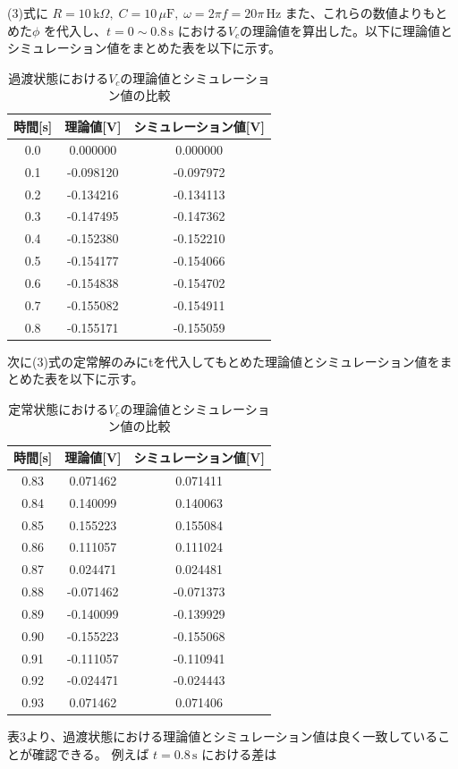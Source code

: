 \documentclass{jarticle}
\begin{document}
(3)式に
$R = 10\,\text{k}\Omega,\; C = 10\,\mu\text{F},\; \omega = 2\pi f = 20\pi\,\text{Hz}$
また、これらの数値よりもとめた$\phi$ を代入し、$t = 0 \sim 0.8\,\text{s}$
における$V_{c}$の理論値を算出した。以下に理論値とシミュレーション値をまとめた表を以下に示す。
\begin{table}[H]
\centering
\caption{過渡状態における$V_{c}$の理論値とシミュレーション値の比較}
\begin{tabular}{ccc}
\toprule
時間[s] & 理論値[V] & シミュレーション値[V] \\
\midrule
0.0 & 0.000000 & 0.000000 \\
0.1 & -0.098120 & -0.097972 \\
0.2 & -0.134216 & -0.134113 \\
0.3 & -0.147495 & -0.147362 \\
0.4 & -0.152380 & -0.152210 \\
0.5 & -0.154177 & -0.154066 \\
0.6 & -0.154838 & -0.154702 \\
0.7 & -0.155082 & -0.154911 \\
0.8 & -0.155171 & -0.155059 \\
\bottomrule
\end{tabular}
\end{table}
次に(3)式の定常解のみにtを代入してもとめた理論値とシミュレーション値をまとめた表を以下に示す。
\begin{table}[H]
\centering
\caption{定常状態における$V_{c}$の理論値とシミュレーション値の比較}
\begin{tabular}{ccc}
\toprule
時間[s] & 理論値[V] & シミュレーション値[V] \\
\midrule
0.83 & 0.071462 & 0.071411 \\
0.84 & 0.140099 & 0.140063 \\
0.85 & 0.155223 & 0.155084 \\
0.86 & 0.111057 & 0.111024 \\
0.87 & 0.024471 & 0.024481 \\
0.88 & -0.071462 & -0.071373 \\
0.89 & -0.140099 & -0.139929 \\
0.90 & -0.155223 & -0.155068 \\
0.91 & -0.111057 & -0.110941 \\
0.92 & -0.024471 & -0.024443 \\
0.93 & 0.071462 & 0.071406 \\
\bottomrule
\end{tabular}
\end{table}
表3より、過渡状態における理論値とシミュレーション値は良く一致していることが確認できる。
例えば $t=0.8\,\mathrm{s}$ における差は
\end{document}
